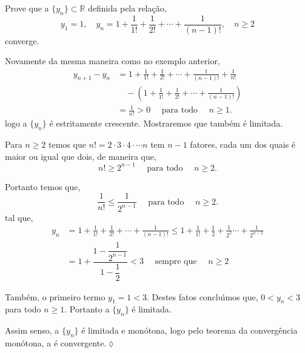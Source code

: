 \begin{exer}
Prove que a \seq $\{y_n\}\subset \mathbb{R}$ definida pela rela\c{c}\~{a}o,
\begin{equation*}
    y_1=1,\quad y_n=1+\frac{1}{1!}+\frac{1}{2!}+\cdots+\frac{1}{(n-1)!},\quad n\geq 2
\end{equation*}
converge.
\end{exer}

\solo Novamente da mesma maneira como no exemplo anterior,
\begin{align*}
    y_{n+1}-y_n&=1+\frac{1}{1!}+\frac{1}{2!}+\cdots+\frac{1}{(n-1)!}+\frac{1}{n!}\\[2ex]
               &\quad -\left(1+\frac{1}{1!}+\frac{1}{2!}+\cdots+\frac{1}{(n-1)!}\right)\\[2ex]
               &=\frac{1}{n!}>0\quad \text{ para todo }\quad n \geq 1.
\end{align*}
logo a \seq $\{y_n\}$ \'{e} estritamente crescente. Mostraremos que tamb\'{e}m \'{e} limitada.

Para $n\geq 2$ temos que $n!=2\cdot 3\cdot 4\cdot\cdots n$ tem $n-1$ fatores, cada um dos quais \'{e} maior ou igual que dois, de maneira que,
\begin{equation*}
    n!\geq 2^{n-1}\quad \text{ para todo }\quad n\geq 2.
\end{equation*}

Portanto temos que,
\begin{equation*}
    \frac{1}{n!}\leq \dfrac{1}{2^{n-1}} \quad \text{ para todo }\quad n\geq 2.
\end{equation*}
tal que,
\begin{align*}
    y_n&=1+\frac{1}{1!}+\frac{1}{2!}+\cdots+\frac{1}{(n-1)!}
       \leq 1+\frac{1}{1!}+\frac{1}{2}+\frac{1}{2^2}\cdots+\frac{1}{2^{n-2}}\\[2ex]
       &=1+\dfrac{1-\dfrac{1}{2^{n-1}}}{1-\dfrac{1}{2}}<3\quad \text{ sempre que }\quad n\geq 2
\end{align*}

Tamb\'{e}m, o primeiro termo $y_1=1<3$. Destes fatos conclu\'{\i}mos que, $0<y_n<3$ para todo $n\geq 1$. Portanto a \seq $\{y_n\}$ \'{e} limitada.

Assim senso, a \seq $\{y_n\}$ \'{e} limitada e mon\'{o}tona, logo pelo teorema da converg\^{e}ncia mon\'{o}tona, a \seq \'{e} convergente.\hfill \(\lozenge\)

